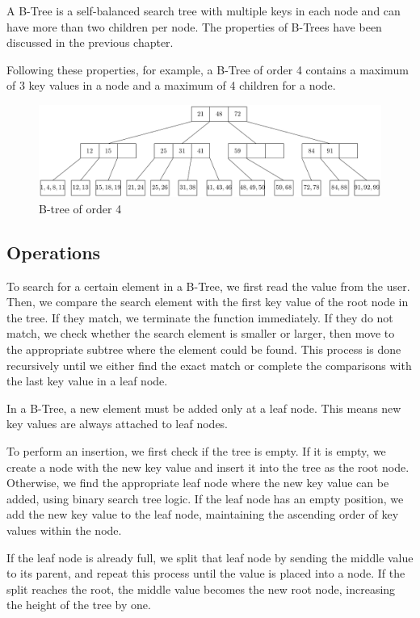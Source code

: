 A B-Tree is a self-balanced search tree with multiple keys in each node and can have more than two children per node. The properties of B-Trees have been discussed in the previous chapter.  

Following these properties, for example, a B-Tree of order 4 contains a maximum of 3 key values in a node and a maximum of 4 children for a node.  
\begin{figure}[H]
  \centering
  \includegraphics[width=\textwidth]{Figure/B-Tree.pdf}
  \caption{B-tree of order 4}
\end{figure}

\subsection{Operations}
To search for a certain element in a B-Tree, we first read the value from the user. Then, we compare the search element with the first key value of the root node in the tree. If they match, we terminate the function immediately. If they do not match, we check whether the search element is smaller or larger, then move to the appropriate subtree where the element could be found. This process is done recursively until we either find the exact match or complete the comparisons with the last key value in a leaf node.

In a B-Tree, a new element must be added only at a leaf node. This means new key values are always attached to leaf nodes.

To perform an insertion, we first check if the tree is empty. If it is empty, we create a node with the new key value and insert it into the tree as the root node. Otherwise, we find the appropriate leaf node where the new key value can be added, using binary search tree logic. If the leaf node has an empty position, we add the new key value to the leaf node, maintaining the ascending order of key values within the node.

If the leaf node is already full, we split that leaf node by sending the middle value to its parent, and repeat this process until the value is placed into a node. If the split reaches the root, the middle value becomes the new root node, increasing the height of the tree by one.

